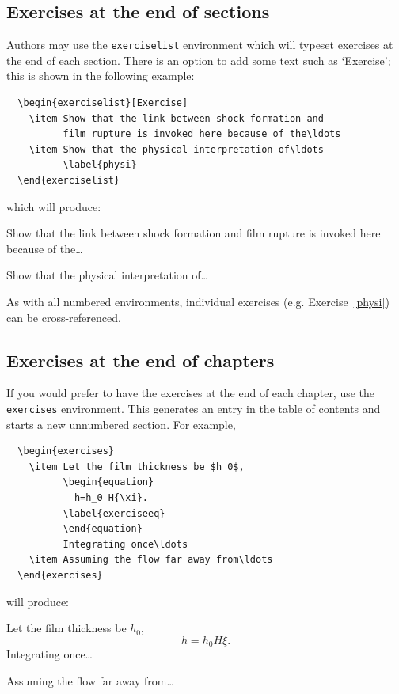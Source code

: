 \subsection{Exercises at the end of sections}
\label{exendofsections}

Authors may use the \verb"exerciselist" environment which will typeset exercises at the end of each section. There is an option to add some text such as `Exercise'; this is shown in the following example:
\begin{verbatim}
  \begin{exerciselist}[Exercise]
    \item Show that the link between shock formation and
          film rupture is invoked here because of the\ldots
    \item Show that the physical interpretation of\ldots
          \label{physi}
  \end{exerciselist}
\end{verbatim}
which will produce:
  \begin{exerciselist}[Exercise]
    \item Show that the link between shock formation and
          film rupture is invoked here because of the\ldots
    \item Show that the physical interpretation of\ldots
          \label{physi}
  \end{exerciselist}
As with all numbered environments, individual exercises (e.g. Exercise~\ref{physi}) can be cross-referenced.

\subsection{Exercises at the end of chapters}

If you would prefer to have the exercises at the end of each chapter, use the \verb"exercises" environment. This generates an entry in the table of contents and starts a new unnumbered section. For example,
\begin{verbatim}
  \begin{exercises}
    \item Let the film thickness be $h_0$,
          \begin{equation}
            h=h_0 H{\xi}.
          \label{exerciseeq}
          \end{equation}
          Integrating once\ldots
    \item Assuming the flow far away from\ldots
  \end{exercises}
\end{verbatim}
will produce:
  \begin{exercises}
    \item Let the film thickness be $h_0$,
          \begin{equation}
            h=h_0 H{\xi}.
          \label{exerciseeq}
          \end{equation}
          Integrating once\ldots
    \item Assuming the flow far away from\ldots
  \end{exercises}

